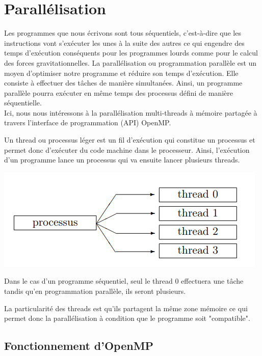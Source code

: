 \chapter{Parallélisation }
Les programmes que nous écrivons sont tous séquentiels, c'est-à-dire que les instructions vont s'exécuter les unes à la suite des autres ce qui engendre des temps d'exécution conséquents pour les programmes lourds comme pour le calcul des forces gravitationnelles.
La parallélisation ou programmation parallèle est un moyen d'optimiser notre programme et réduire son temps d'exécution. 
Elle consiste à effectuer des tâches de manière simultanées. Ainsi, un programme parallèle pourra exécuter en même temps des processus défini de manière séquentielle.\\

Ici, nous nous intéressons à la parallélisation multi-threads à mémoire partagée à travers l'interface de programmation (API) OpenMP.

Un thread ou processus léger est un fil d'exécution qui constitue un processus et permet donc d'exécuter du code machine dans le processeur. Ainsi, l'exécution d'un programme lance un processus qui va ensuite lancer plusieurs threads.


\begin{center}
\includegraphics[scale=0.8]{images/process_thread.png}
\label{fig6}
\end{center} 

Dans le cas d'un programme séquentiel, seul le thread 0 effectuera une tâche tandis qu'en programmation parallèle, ils seront plusieurs.

La particularité des threads est qu'ils partagent la même zone mémoire ce qui permet donc la parallélisation à condition que le programme soit "compatible".

\section{Fonctionnement d'OpenMP}
